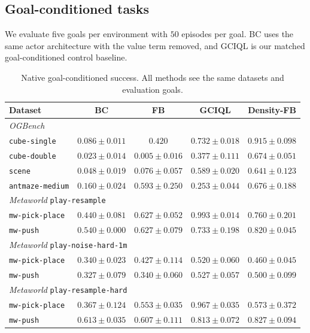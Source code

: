 \documentclass[11pt]{article}
\begin{document}
\subsection{Goal-conditioned tasks}

We evaluate five goals per environment with $50$ episodes per goal. BC uses the same actor architecture with the value term removed, and GCIQL is our matched goal-conditioned control baseline.

\begin{table}[h]
    \centering
    \setlength{\tabcolsep}{5pt}
    \begin{tabular}{l cccc}
    \toprule
    Dataset & BC & FB & GCIQL & Density-FB \\
    \midrule
    \multicolumn{5}{l}{\emph{OGBench}}\\
    \texttt{cube-single} & $0.086\pm0.011$ & $0.420$ & $0.732\pm0.018$ & $\mathbf{0.915\pm0.098}$ \\
    \texttt{cube-double} & $0.023\pm0.014$ & $0.005\pm0.016$ & $0.377\pm0.111$ & $\mathbf{0.674\pm0.051}$ \\
    \texttt{scene} & $0.048\pm0.019$ & $0.076\pm0.057$ & $0.589\pm0.020$ & $\mathbf{0.641\pm0.123}$ \\
    \texttt{antmaze-medium} & $0.160\pm0.024$ & $0.593\pm0.250$ & $0.253\pm0.044$ & $\mathbf{0.676\pm0.188}$ \\
    \midrule
    \multicolumn{5}{l}{\emph{Metaworld} \texttt{play-resample}}\\
    \texttt{mw-pick-place} & $0.440\pm0.081$ & $0.627\pm0.052$ & $\mathbf{0.993\pm0.014}$ & $0.760\pm0.201$ \\
    \texttt{mw-push} & $0.540\pm0.000$ & $0.627\pm0.079$ & $0.733\pm0.198$ & $\mathbf{0.820\pm0.045}$ \\
    \midrule
    \multicolumn{5}{l}{\emph{Metaworld} \texttt{play-noise-hard-1m}}\\
    \texttt{mw-pick-place} & $0.340\pm0.023$ & $0.427\pm0.114$ & $\mathbf{0.520\pm0.060}$ & $0.460\pm0.045$ \\
    \texttt{mw-push} & $0.327\pm0.079$ & $0.340\pm0.060$ & $\mathbf{0.527\pm0.057}$ & $0.500\pm0.099$ \\
    \midrule
    \multicolumn{5}{l}{\emph{Metaworld} \texttt{play-resample-hard}}\\
    \texttt{mw-pick-place} & $0.367\pm0.124$ & $0.553\pm0.035$ & $\mathbf{0.967\pm0.035}$ & $0.573\pm0.372$ \\
    \texttt{mw-push} & $0.613\pm0.035$ & $0.607\pm0.111$ & $0.813\pm0.072$ & $\mathbf{0.827\pm0.094}$ \\
    \bottomrule
    \end{tabular}
    \caption{Native goal-conditioned success. All methods see the same datasets and evaluation goals.}
    \label{tab:main}
\end{table}
\end{document}
